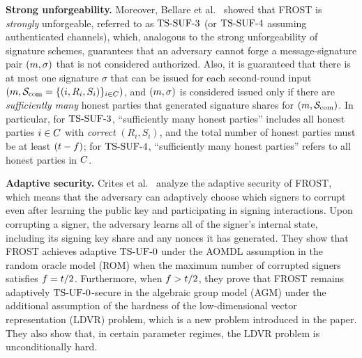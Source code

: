\medskip
\textbf{Strong unforgeability.} Moreover, Bellare et al.~\cite{BellareCKMTZ22} showed that FROST is \emph{strongly} unforgeable, referred to as $\mathrm{TS}\mbox{-}\mathrm{SUF}\mbox{-}{3}$ (or $\mathrm{TS}\mbox{-}\mathrm{SUF}\mbox{-}{4}$ assuming authenticated channels), which, analogous to the strong unforgeability of signature schemes, guarantees that an adversary cannot forge a message-signature pair $(m,\sigma)$ that is not considered  authorized.
Also, it is guaranteed that there is at most one signature $\sigma$ that can be issued for each second-round input $(m, \mathcal{S}_{\rm com}=\{ (i, R_{i}, S_{i})\}_{i \in C})$, and $(m, \sigma)$ is considered issued only if there are \emph{sufficiently many} honest parties that generated signature shares for $(m, \mathcal{S}_{\rm com})$.
In particular, for $\mathrm{TS}\mbox{-}\mathrm{SUF}\mbox{-}{3}$, ``sufficiently many honest parties'' includes all honest parties $i\in C$ with \emph{correct} $(R_{i}, S_{i})$, and the total number of honest parties must be at least $(t - f)$; for $\mathrm{TS}\mbox{-}\mathrm{SUF}\mbox{-}{4}$, ``sufficiently many honest parties'' refers to all honest parties in $C$.

\medskip
\textbf{Adaptive security.} Crites et al.~\cite{adp-frost} analyze the adaptive security of FROST, which means that the adversary can adaptively choose which signers to corrupt even after learning the public key and participating in signing interactions. Upon corrupting a signer, the adversary learns all of the signer's internal state, including its signing key share and any nonces it has generated. They show that FROST achieves adaptive $\mathrm{TS}\mbox{-}\mathrm{UF}\mbox{-}{0}$ under the AOMDL assumption in the random oracle model (ROM) when the maximum number of corrupted signers satisfies $f = t/2$. Furthermore, when $f > t/2$, they prove that FROST remains adaptively $\mathrm{TS}\mbox{-}\mathrm{UF}\mbox{-}{0}$-secure in the algebraic group model (AGM) under the additional assumption of the hardness of the low-dimensional vector representation (LDVR) problem, which is a new problem introduced in the paper. They also show that, in certain parameter regimes, the LDVR problem is unconditionally hard.



